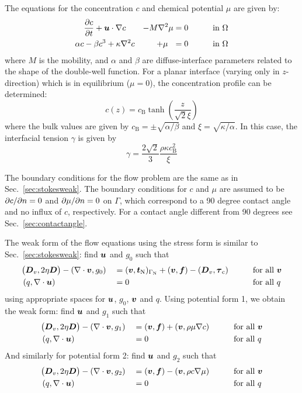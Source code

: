 The equations for the
concentration $c$ and chemical potential $\mu$ are given by:
\begin{alignat}{3}
&\dfrac{\partial c}{\partial t}+\boldsymbol{u}\cdot\nabla c&-M\nabla^2\mu=0&&\qquad\text{in }\Omega
\label{eq:di3}\\
\alpha c&-\beta c^3+\kappa\nabla^2 c&+\mu\,\,\,\,=0&&\qquad\text{in }\Omega
\label{eq:di4}
\end{alignat}
where $M$ is the mobility, and $\alpha$ and $\beta$ are diffuse-interface
parameters related to the shape of the double-well function.
For a planar interface (varying only in $z$-direction) which is in 
equilibrium ($\mu = 0$), the concentration
profile can be determined:
\begin{equation}
c(z) = c_\text{B} \tanh\left(\frac{z}{\sqrt{2} \xi}\right)
\end{equation}
where the bulk values are given by $c_\text{B}=\pm \sqrt{\alpha/\beta}$ and 
$\xi = \sqrt{\kappa / \alpha} $. In this case, the interfacial tension $\gamma$ 
is given by 
\begin{equation}
\gamma = \frac{2 \sqrt{2}}{3} \frac{\rho \kappa c_\text{B}^2}{\xi}
\label{eq:di_surface_tension}
\end{equation}

The boundary conditions for the
flow problem are the same as in Sec.~\ref{sec:stokesweak}.
The boundary conditions for $c$ and $\mu$ are assumed to be
$\partial c/\partial n=0$ and $\partial \mu/\partial n=0$ on $\Gamma$, which correspond to a 
90 degree contact angle and no influx of $c$, respectively. For a contact angle 
different from 90 degrees see 
Sec.~\ref{sec:contactangle}.                                                    


The weak form of the flow equations using the stress form is similar to 
Sec.~\ref{sec:stokesweak}:
find $\boldsymbol{u}$ and $g_0$ such that
\begin{alignat*}{3}
&\big(\boldsymbol{D}_v,2\eta\boldsymbol{D}\big)-(\nabla\cdot\boldsymbol{v},g_0)&&=(\boldsymbol{v},
\boldsymbol{t}_{\text{N}})_{\Gamma_{\text{N}}}+(\boldsymbol{v},\boldsymbol{f})-(\boldsymbol{D}_v,\boldsymbol{\tau}_\text{c})&\qquad&\text{for all }\boldsymbol{v}\\
&\,(q,\nabla\cdot\boldsymbol{u})&&=0&\qquad&\text{for all }q
\end{alignat*}
using appropriate spaces for $\boldsymbol{u}$, $g_0$, $\boldsymbol{v}$ and $q$. Using potential 
form 1, we obtain the weak form: 
find $\boldsymbol{u}$ and $g_1$ such that
\begin{alignat*}{3}
&\big(\boldsymbol{D}_v,2\eta\boldsymbol{D}\big)-(\nabla\cdot\boldsymbol{v},g_1)&&=
(\boldsymbol{v},\boldsymbol{f})+(\boldsymbol{v},\rho \mu \nabla c)&\qquad&\text{for all }\boldsymbol{v}\\
&\,(q,\nabla\cdot\boldsymbol{u})&& =0&\qquad&\text{for all }q
\end{alignat*}
And similarly for potential form 2:
find $\boldsymbol{u}$ and $g_2$ such that
\begin{alignat*}{3}
&\big(\boldsymbol{D}_v,2\eta\boldsymbol{D}\big)-(\nabla\cdot\boldsymbol{v},g_2)&&= (\boldsymbol{v},\boldsymbol{f})   
-(\boldsymbol{v},\rho c \nabla \mu)&\qquad&\text{for all }\boldsymbol{v}\\
&\,(q,\nabla\cdot\boldsymbol{u})&& =0 &\qquad&\text{for all }q
\end{alignat*}

